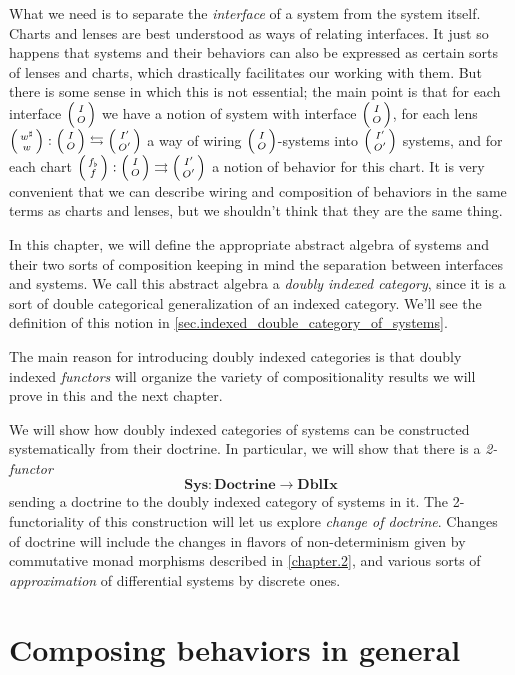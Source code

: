\documentclass[DynamicalBook]{subfiles}
\begin{document}
What we need is to separate the \emph{interface} of a system from the system
itself. Charts and lenses are best understood as ways of relating interfaces. It just
so happens that systems and their behaviors can also be expressed as certain
sorts of lenses and charts, which drastically facilitates our working with them.
But there is some sense in which this is not essential; the main point is that
for each interface $\lens{I}{O}$ we have a notion of system with interface
$\lens{I}{O}$, for each lens $\lens{w^{\sharp}}{w} : \lens{I}{O} \fromto
\lens{I'}{O'}$ a way of wiring $\lens{I}{O}$-systems into $\lens{I'}{O'}$
systems, and for each chart $\lens{f_{\flat}}{f} : \lens{I}{O} \tto
\lens{I'}{O'}$ a notion of behavior for this chart. It is very convenient that
we can describe wiring and composition of behaviors in the same terms as charts
and lenses, but we shouldn't think that they are the same thing.

In this chapter, we will define the appropriate abstract algebra of systems and
their two sorts of composition keeping in mind the separation between interfaces
and systems. We call this abstract algebra a \emph{doubly indexed category},
since it is a sort of double categorical generalization of an indexed category.
We'll see the definition of this notion in
\cref{sec.indexed_double_category_of_systems}.

The main reason for introducing doubly indexed categories is that doubly indexed
\emph{functors} will organize the variety of compositionality results we will
prove in this and the next chapter. 

We will show how doubly
indexed categories of systems can be constructed systematically from their
doctrine. In particular, we will show that there is a
\emph{2-functor} 
$$\textbf{Sys} : \textbf{Doctrine} \to \textbf{DblIx}$$
sending a doctrine to the doubly indexed category of systems in it. The
2-functoriality of this construction will let us explore \emph{change of
  doctrine}. Changes of doctrine will include the changes in flavors of
non-determinism given by commutative monad morphisms described in
\cref{chapter.2}, and various sorts of \emph{approximation} of differential
systems by discrete ones. 




\section{Composing behaviors in general}\label{sec.behaviors_general}
\end{document}
